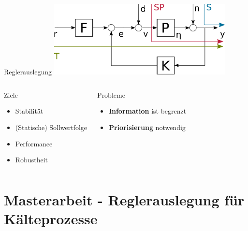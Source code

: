 \documentclass[fleqn,11pt,aspectratio=43]{beamer}
\begin{document}
\begin{frame}{Reglerauslegung}
\centering
\includegraphics[width = 0.7\textwidth]{Reglerauslegung}
\begin{columns}[onlytextwidth]
	\begin{exampleblock}{Ziele}
		\begin{itemize}
			\item Stabilität
			\item (Statische) Sollwertfolge
			\item Performance
			\item Robustheit
		\end{itemize}
	\end{exampleblock}
	\begin{alertblock}{Probleme}
		\begin{itemize}
			\item \textbf{Information} ist begrenzt
			\item \textbf{Priorisierung} notwendig
		\end{itemize}
	\end{alertblock}
  \end{columns}

\end{frame}

\section{Masterarbeit - Reglerauslegung für Kälteprozesse}
\end{document}
